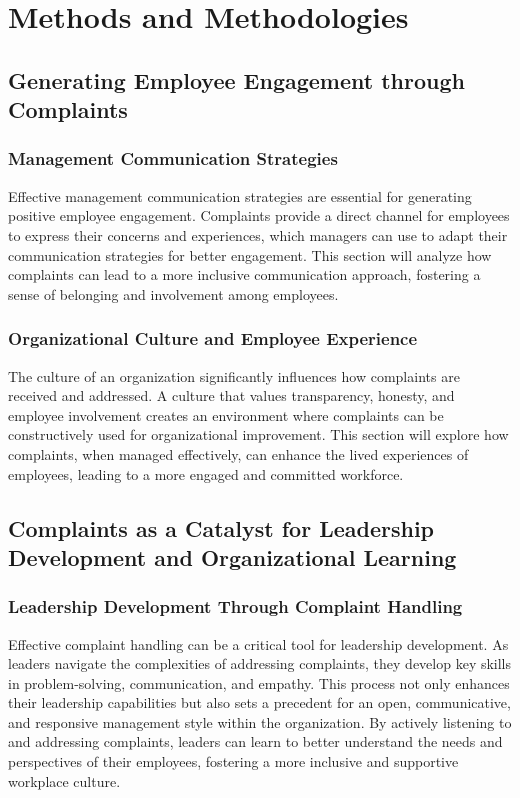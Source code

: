 \documentclass[runningheads]{llncs}
\begin{document}
\newpage
\section{Methods and Methodologies}
\subsection{Generating Employee Engagement through Complaints}
\subsubsection{Management Communication Strategies}
Effective management communication strategies are essential for generating positive employee engagement. Complaints provide a direct channel for employees to express their concerns and experiences, which managers can use to adapt their communication strategies for better engagement. This section will analyze how complaints can lead to a more inclusive communication approach, fostering a sense of belonging and involvement among employees.

\subsubsection{Organizational Culture and Employee Experience}
The culture of an organization significantly influences how complaints are received and addressed. A culture that values transparency, honesty, and employee involvement creates an environment where complaints can be constructively used for organizational improvement. This section will explore how complaints, when managed effectively, can enhance the lived experiences of employees, leading to a more engaged and committed workforce.

\subsection{Complaints as a Catalyst for Leadership Development and Organizational Learning}
\subsubsection{Leadership Development Through Complaint Handling}
Effective complaint handling can be a critical tool for leadership development. As leaders navigate the complexities of addressing complaints, they develop key skills in problem-solving, communication, and empathy. This process not only enhances their leadership capabilities but also sets a precedent for an open, communicative, and responsive management style within the organization. By actively listening to and addressing complaints, leaders can learn to better understand the needs and perspectives of their employees, fostering a more inclusive and supportive workplace culture.
\end{document}
